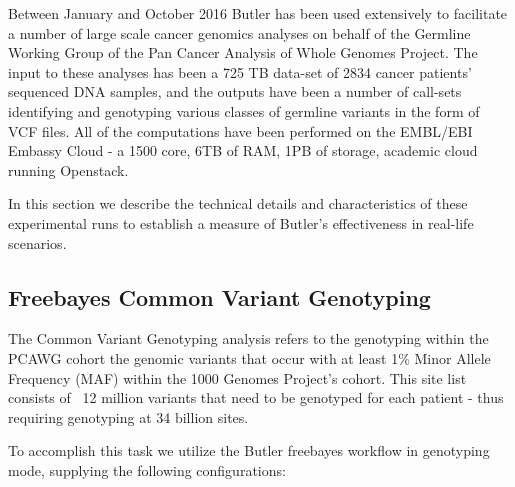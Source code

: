 Between January and October 2016 Butler has been used extensively to facilitate a number of large scale cancer genomics analyses on behalf of the Germline Working Group of the Pan Cancer Analysis of Whole Genomes Project. The input to these analyses has been a 725 TB data-set of 2834 cancer patients' sequenced DNA samples, and the outputs have been a number of call-sets identifying and genotyping various classes of germline variants in the form of VCF files. All of the computations have been performed on the EMBL/EBI Embassy Cloud - a 1500 core, 6TB of RAM, 1PB of storage, academic cloud running Openstack.

In this section we describe the technical details and characteristics of these experimental runs to establish a measure of Butler's effectiveness in real-life scenarios.

\subsection{Freebayes Common Variant Genotyping}

The Common Variant Genotyping analysis refers to the genotyping within the PCAWG cohort the genomic variants that occur with at least 1\% Minor Allele Frequency (MAF) within the 1000 Genomes Project's\autocite{10002012integrated} cohort. This site list consists of ~12 million variants that need to be genotyped for each patient - thus requiring genotyping at 34 billion sites.

To accomplish this task we utilize the Butler freebayes workflow in genotyping mode, supplying the following configurations:

